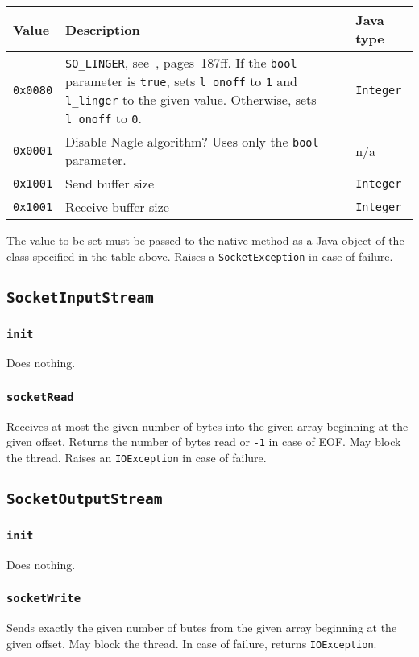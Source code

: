 \documentclass[twocolumn,a4paper]{article}      %
\newcommand{\class}[1]{\subsection{\texttt{#1}}}
\newcommand{\method}[1]{\subsubsection*{\texttt{#1}}}
\begin{document}
\medskip
\begin{tabular}{|l|p{3cm}|l|} \hline
Value           & Description & Java type \\ \hline
\texttt{0x0080} & \texttt{SO\_LINGER}, see~\cite{stevens1}, pages~187ff.
                  If the \texttt{bool} parameter is \texttt{true}, sets
                  \texttt{l\_onoff} to \texttt{1} and \texttt{l\_linger}
                  to the given value. Otherwise, sets \texttt{l\_onoff} to \texttt{0}. & \texttt{Integer} \\
\texttt{0x0001} & Disable Nagle algorithm? Uses only the \texttt{bool} parameter. & n/a \\
\texttt{0x1001} & Send buffer size & \texttt{Integer} \\
\texttt{0x1001} & Receive buffer size & \texttt{Integer} \\ \hline
\end{tabular}
\medskip

The value to be set must be passed to the native method as a Java
object of the class specified in the table above. Raises a
\texttt{SocketException} in case of failure.

\class{SocketInputStream}

\method{init}

Does nothing.

\method{socketRead}

Receives at most the given number of bytes into the given array
beginning at the given offset. Returns the number of bytes read or
\texttt{-1} in case of EOF. May block the thread. Raises an
\texttt{IOException} in case of failure.

\class{SocketOutputStream}

\method{init}

Does nothing.

\method{socketWrite}

Sends exactly the given number of butes from the given array beginning
at the given offset. May block the thread. In case of failure, returns
\texttt{IOException}.



\end{document}
